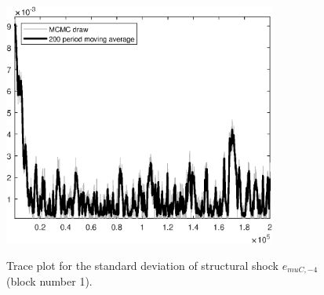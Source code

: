 \begin{figure}[H]
\centering
  \includegraphics[width=0.8\textwidth]{BRS_sectoral_rest/graphs/TracePlot_SE_e_muC_news_blck_1}\\
    \caption{Trace plot for the standard deviation of structural shock ${e_{muC,-4}}$ (block number 1).}
\end{figure}
